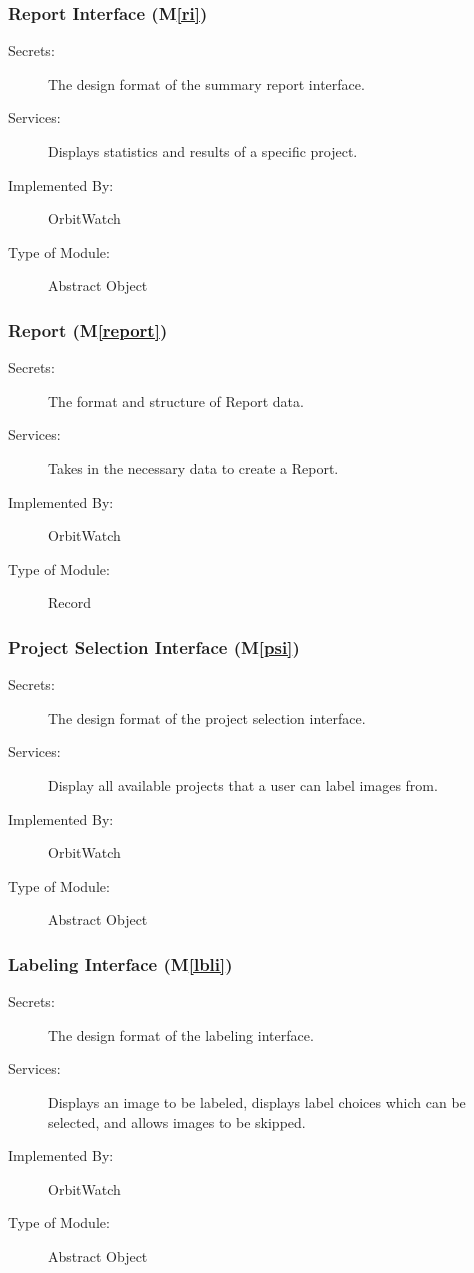 \documentclass[12pt, titlepage]{article}
\newcommand{\mref}[1]{M\ref{#1}}
\begin{document}
\subsubsection{Report Interface (\mref{ri})}

\begin{description}
\item[Secrets:]The design format of the summary report interface.
\item[Services:] Displays statistics and results of a specific project.
\item[Implemented By:] OrbitWatch
\item[Type of Module:] Abstract Object
\end{description}

\subsubsection{Report (\mref{report})}

\begin{description}
\item[Secrets:]The format and structure of Report data.
\item[Services:] Takes in the necessary data to create a Report.
\item[Implemented By:] OrbitWatch
\item[Type of Module:] Record
\end{description}

\subsubsection{Project Selection Interface (\mref{psi})}
\begin{description}
\item[Secrets:]The design format of the project selection interface.
\item[Services:] Display all available projects that a user can label images from.
\item[Implemented By:] OrbitWatch
\item[Type of Module:] Abstract Object
\end{description}

\subsubsection{Labeling Interface (\mref{lbli})}
\begin{description}
\item[Secrets:] The design format of the labeling interface.
\item[Services:] Displays an image to be labeled, displays label choices which can be selected, and allows images to be skipped.
\item[Implemented By:] OrbitWatch
\item[Type of Module:] Abstract Object
\end{description}
\end{document}
